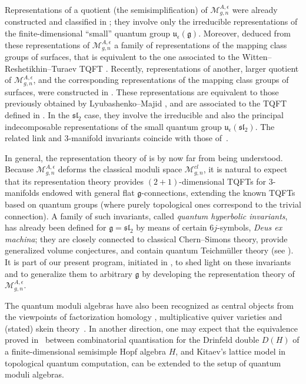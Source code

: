 \documentclass[10pt,a4paper]{amsart}
\numberwithin{equation}{section}
\theoremstyle{definition}
\newcommand{\e}{\epsilon}
\newcommand{\Mm}{{\mathcal M}}
\begin{document}
Representations of a quotient (the semisimplification) of $\Mm_{g,n}^{A, \e}$ were already constructed and classified in \cite{AG3}; they involve only the irreducible representations of the finite-dimensional ``small'' quantum group $\mathfrak{u}_{\e}(\mathfrak{g})$. Moreover, \cite{AG3} deduced from these representations of $\Mm_{g,n}^{A, \e}$ a family of representations of the mapping class groups of surfaces, that is equivalent to the one associated to the Witten--Reshetikhin--Turaev TQFT \cite{RT,Wi}. Recently, representations of another, larger quotient of $\Mm_{g,n}^{A, \e}$, and the corresponding representations of the mapping class groups of surfaces, were constructed in \cite{Faitg,Faitg2}. These representations are equivalent to those previously obtained by Lyubashenko--Majid \cite{LM}, and are associated to the TQFT defined in \cite{dRGGP-MR,dRGP-M}. In the ${\mathfrak{sl}_2}$ case, they involve the irreducible and also the principal indecomposable representations of the small quantum group $\mathfrak{u}_{\e}({\mathfrak{sl}_2})$. The related link and $3$-manifold invariants coincide with those of~\cite{BBG,Mu}.%

In general, the representation theory of \smash{$\Mm_{g,n}^{A, \e}$} is by now far from being understood. Because $\Mm_{g,n}^{A, \e}$ deforms the classical moduli space $\Mm_{g,n}^{cl}$, it is natural to expect that its representation theory provides $(2+1)$-dimensional TQFTs for $3$-manifolds endowed with general flat $\mathfrak{g}$-connections, extending the known TQFTs based on quantum groups (where purely topological ones correspond to the trivial connection). A family of such invariants, called {\it quantum hyperbolic invariants}, has already been defined for $\mathfrak{g}={\mathfrak{sl}_2}$ by means of certain $6j$-symbols, {\it Deus ex machina}; they are closely connected to classical Chern--Simons theory, provide generalized volume conjectures, and contain quantum Teichm\"uller theory (see \cite{BB-3,BB-2,BB-1,BB0,BB1,BB2,BB3}). It is part of our present program, initiated in \cite{B}, to shed light on these invariants and to generalize them to arbitrary $\mathfrak{g}$ by developing the representation theory of $\Mm_{g,n}^{A, \e}$.

 The quantum moduli algebras have also been recognized as central objects from the viewpoints of factorization homology \cite{B-BZ-J}, multiplicative quiver varieties \cite{GJS19} and (stated) skein theory~\mbox{\cite{BFR,BFK,CL,Faitg4}}. In another direction, one may expect that the equivalence proved in~\cite{Meus} between combinatorial quantisation for the Drinfeld double $D(H)$ of a finite-dimensional semisimple Hopf algebra $H$, and Kitaev's lattice model in topological quantum computation, can be extended to the setup of quantum moduli algebras.
\end{document}
